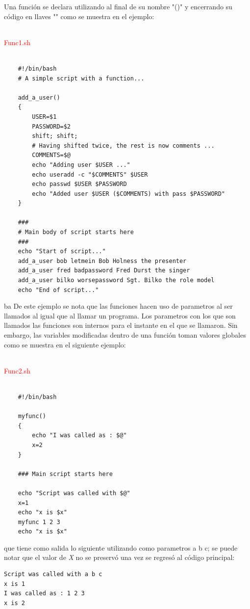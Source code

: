 \documentclass{article}
\begin{document}
Una función se declara utilizando al final de su nombre "()" y encerrando su código en llaves "{}" como se muestra en el ejemplo:

~\\
\textcolor{red}{Func1.sh}
\begin{framed}
\begin{verbatim}

	#!/bin/bash
    # A simple script with a function...
    
    add_a_user()
    {
    	USER=$1
        PASSWORD=$2
        shift; shift;
        # Having shifted twice, the rest is now comments ...
        COMMENTS=$@
        echo "Adding user $USER ..."
        echo useradd -c "$COMMENTS" $USER
        echo passwd $USER $PASSWORD
        echo "Added user $USER ($COMMENTS) with pass $PASSWORD"
    }
    
    ###
    # Main body of script starts here
    ###
    echo "Start of script..."
    add_a_user bob letmein Bob Holness the presenter
    add_a_user fred badpassword Fred Durst the singer
    add_a_user bilko worsepassword Sgt. Bilko the role model
    echo "End of script..."
\end{verbatim}
\end{framed}
ba
De este ejemplo se nota que las funciones hacen uso de parametros al ser llamados al igual que al llamar un programa. Los parametros con los que son llamados las funciones son internos para el instante en el que se llamaron. Sin embargo, las variables modificadas dentro de una función toman valores globales como se muestra en el siguiente ejemplo:

~\\
\textcolor{red}{Func2.sh}
\begin{framed}
\begin{verbatim}
	
    #!/bin/bash
    
    myfunc()
    {
    	echo "I was called as : $@"
        x=2	
    }
    
    ### Main script starts here 
    
    echo "Script was called with $@"
    x=1
    echo "x is $x"
    myfunc 1 2 3
    echo "x is $x"
\end{verbatim}
\end{framed}

que tiene como salida lo siguiente utilizando como parametros a b c; se puede notar que el valor de \textit{X} no se preservó una vez se regresó al código principal:

\begin{verbatim}
Script was called with a b c
x is 1
I was called as : 1 2 3
x is 2
\end{verbatim}
\end{document}

